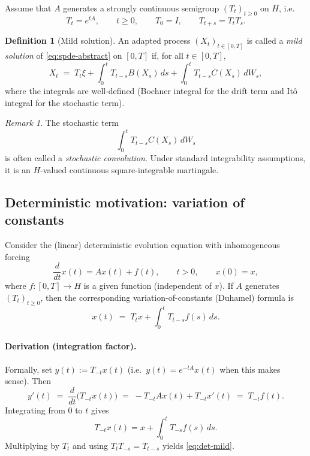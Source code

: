 \documentclass[11pt]{article}
\theoremstyle{definition}
\newtheorem{definition}{Definition}
\theoremstyle{remark}
\newtheorem{remark}{Remark}
\begin{document}
Assume that $A$ generates a strongly continuous semigroup $(T_t)_{t\ge 0}$ on $H$, i.e.
\[
    T_t = e^{tA}, \qquad t \ge 0,
    \qquad
    T_0 = I,
    \qquad
    T_{t+s} = T_t T_s.
\]

\begin{definition}[Mild solution]
An adapted process $(X_t)_{t\in[0,T]}$ is called a \emph{mild solution} of \eqref{eq:spde-abstract} on $[0,T]$ if, for all $t\in[0,T]$,
\begin{equation}\label{eq:mild}
    X_t
    \;=\;
    T_t \xi
    + \int_0^t T_{t-s} B(X_s)\,ds
    + \int_0^t T_{t-s} C(X_s)\,dW_s,
\end{equation}
where the integrals are well-defined (Bochner integral for the drift term and It\^o integral for the stochastic term).
\end{definition}

\begin{remark}
The stochastic term
\[
    \int_0^t T_{t-s} C(X_s)\,dW_s
\]
is often called a \emph{stochastic convolution}. Under standard integrability assumptions, it is an $H$-valued continuous square-integrable martingale.
\end{remark}

\subsection*{Deterministic motivation: variation of constants}

Consider the (linear) deterministic evolution equation with inhomogeneous forcing
\begin{equation}\label{eq:det}
    \frac{d}{dt}x(t) = Ax(t) + f(t),
    \qquad t>0,
    \qquad x(0) = x,
\end{equation}
where $f\colon [0,T]\to H$ is a given function (independent of $x$).
If $A$ generates $(T_t)_{t\ge 0}$, then the corresponding variation-of-constants (Duhamel) formula is
\begin{equation}\label{eq:det-mild}
    x(t)
    \;=\;
    T_t x
    + \int_0^t T_{t-s} f(s)\,ds.
\end{equation}

\paragraph{Derivation (integration factor).}
Formally, set $y(t) := T_{-t}x(t)$ (i.e.\ $y(t)=e^{-tA}x(t)$ when this makes sense). Then
\[
    y'(t)
    \;=\;
    \frac{d}{dt}\bigl(T_{-t}x(t)\bigr)
    \;=\;
    -T_{-t}Ax(t) + T_{-t}x'(t)
    \;=\;
    T_{-t} f(t).
\]
Integrating from $0$ to $t$ gives
\[
    T_{-t}x(t) = x + \int_0^t T_{-s} f(s)\,ds.
\]
Multiplying by $T_t$ and using $T_t T_{-s} = T_{t-s}$ yields \eqref{eq:det-mild}.
\end{document}
